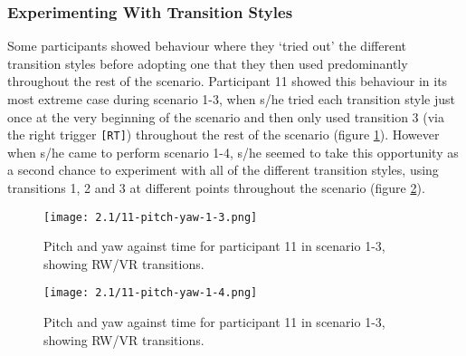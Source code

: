 
\subsubsection{Experimenting With Transition Styles}

Some participants showed behaviour where they `tried out' the different transition styles before adopting one that they then used predominantly throughout the rest of the scenario. Participant 11 showed this behaviour in its most extreme case during scenario 1-3, when s/he tried each transition style just once at the very beginning of the scenario and then only used transition 3 (via the right trigger \texttt{[RT]}) throughout the rest of the scenario (figure \ref{11-pitch-yaw-1-3.png}). However when s/he came to perform scenario 1-4, s/he seemed to take this opportunity as a second chance to experiment with all of the different transition styles, using transitions 1, 2 and 3 at different points throughout the scenario (figure \ref{11-pitch-yaw-1-4.png}).

\begin{figure}
	\begin{center}
	\texttt{[image: 2.1/11-pitch-yaw-1-3.png]}
	\caption{Pitch and yaw against time for participant 11 in scenario 1-3, showing RW/VR transitions.}
	\label{11-pitch-yaw-1-3.png}
	\end{center}
\end{figure}

\begin{figure}
	\begin{center}
	\texttt{[image: 2.1/11-pitch-yaw-1-4.png]}
	\caption{Pitch and yaw against time for participant 11 in scenario 1-3, showing RW/VR transitions.}
	\label{11-pitch-yaw-1-4.png}
	\end{center}
\end{figure}



